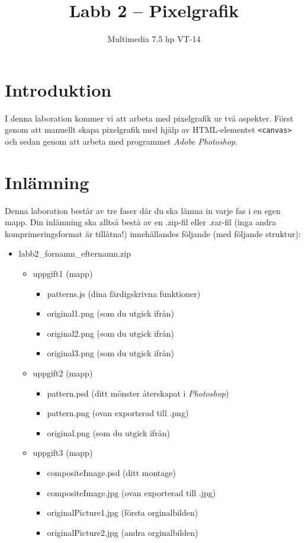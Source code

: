 \documentclass[12pt]{article}
\date{}
\title{ Labb 2 -- Pixelgrafik }
\author{ Multimedia 7.5 hp VT-14 }
\begin{document}
\maketitle
\vspace{-2em}



\section{Introduktion}
I denna laboration kommer vi att arbeta med pixelgrafik ur två aspekter. Först genom att manuellt skapa pixelgrafik med hjälp av HTML-elementet \texttt{<canvas>} och sedan genom att arbeta med programmet \emph{Adobe Photoshop}.

\section{Inlämning}
Denna laboration består av tre faser där du ska lämna in varje fas i en egen mapp. Din inlämning ska alltså bestå av en .zip-fil eller .rar-fil (inga andra komprimeringsformat är tillåtna!) innehållandes följande (med följande struktur):
  \begin{itemize}
    \item labb2\_fornamn\_efternamn.zip

      \begin{itemize}
        \item uppgift1 (mapp)
          \begin{itemize}
            \item patterns.js (dina färdigskrivna funktioner)
            \item original1.png (som du utgick ifrån)
            \item original2.png (som du utgick ifrån)
            \item original3.png (som du utgick ifrån)
          \end{itemize}

        \item uppgift2 (mapp)
          \begin{itemize}
            \item pattern.psd  (ditt mönster återskapat i \emph{Photoshop})
            \item pattern.png  (ovan exporterad till .png)
            \item original.png (som du utgick ifrån)
          \end{itemize}

        \item uppgift3 (mapp)
          \begin{itemize}
	    \item compositeImage.psd (ditt montage)
            \item compositeImage.jpg (ovan exporterad till .jpg)
            \item originalPicture1.jpg (första orginalbilden)
            \item originalPicture2.jpg (andra orginalbilden)
          \end{itemize}
    \end{itemize}
  \end{itemize}
\end{document}
